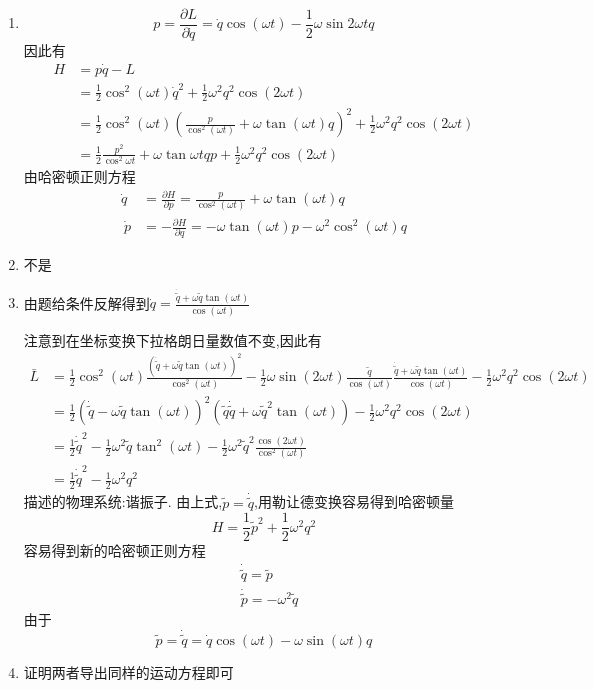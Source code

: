 \begin{solution}
\begin{enumerate}[label=(\arabic*)]
    \item $$p=\frac{\partial L}{\partial \dot{q}}=\dot q\cos(\omega t)-\frac12 \omega\sin{2\omega t}q$$
    因此有
    \begin{align*}
        H&=p\dot q-L\\
        &=\frac12\cos^2(\omega t)\dot q^2+\frac12\omega^2q^2\cos(2\omega t )\\
        &=\frac12\cos^2(\omega t)(\frac{p}{\cos^2(\omega t)}+\omega\tan(\omega t)q)^2+\frac12\omega^2q^2\cos(2\omega t)\\
        &=\frac12\frac{p^2}{\cos^2{\omega t}}+\omega \tan\omega t qp+\frac12\omega^2q^2\cos(2\omega t)
    \end{align*}
    由哈密顿正则方程
    \begin{align*}
        \dot q&=\frac{\partial H}{\partial p}=\frac{p}{\cos^2(\omega t)}+\omega \tan (\omega t)q\\\
        \dot p&=-\frac{\partial H}{\partial q}=-\omega\tan(\omega t)p-\omega^2\cos^2(\omega t)q
    \end{align*}
    \item 不是
    \item 
    由题给条件反解得到$\dot{q}=\frac{\dot{\tilde{q}}+\omega \tilde q\tan(\omega t)}{\cos(\omega t)}$
    
    注意到在坐标变换下拉格朗日量数值不变,因此有
    \begin{align*}
        \bar{L}&=\frac12\cos^2(\omega t)\frac{(\dot{\tilde{q}}+\omega \tilde q\tan(\omega t))^2}{\cos^2(\omega t)}-\frac12\omega\sin(2\omega t)\frac{\tilde q}{\cos(\omega t)}\frac{\dot{\tilde{q}}+\omega \tilde q\tan(\omega t)}{\cos(\omega t)}-\frac12\omega^2q^2\cos(2\omega t)\\&=\frac12(\dot{\tilde{q}}-\omega \tilde q\tan(\omega t))^2(\tilde q\dot{\tilde{q}}+\omega\tilde{q}^2\tan(\omega t))-\frac12\omega^2q^2\cos(2\omega t)\\&=\frac12\dot{\tilde{q}}^2-\frac12\omega^2\tilde{q}\tan^2(\omega t)-\frac12\omega^2\tilde{q}^2\frac{\cos(2\omega t)}{\cos^2(\omega t)}\\&=\frac12\dot{\tilde{q}}^2-\frac12\omega^2q^2
    \end{align*}
    描述的物理系统:谐振子.
    由上式,$\tilde p=\dot{\tilde q}$,用勒让德变换容易得到哈密顿量
    $$H=\frac12 \tilde p^2+\frac12\omega^2q^2$$
    容易得到新的哈密顿正则方程
    \begin{align*}
        &\dot{\tilde q}=\tilde p\\
        &\dot{\tilde p}=-\omega^2\tilde q
    \end{align*}
    由于
    $$\tilde p=\dot{\tilde q}=\dot q\cos(\omega t)-\omega\sin(\omega t)q$$
    \item 证明两者导出同样的运动方程即可


\end{enumerate}
\end{solution}
